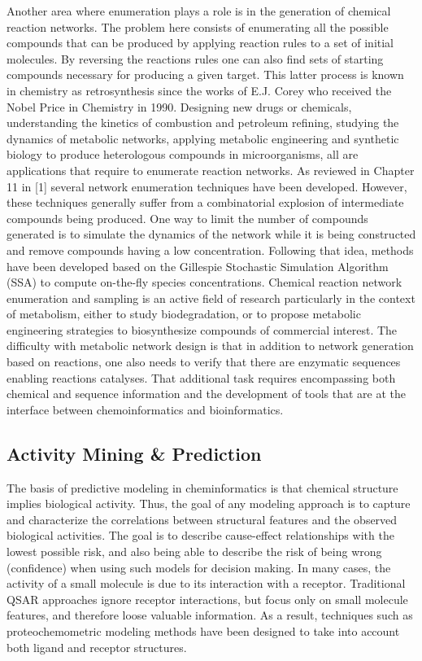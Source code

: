 \documentclass{sig-alternate}
\begin{document}
Another area where enumeration plays a role is in the generation of chemical
reaction networks. The problem here consists of enumerating all the possible
compounds that can be produced by applying reaction rules to a set of initial
molecules. By reversing the reactions rules one can also find sets of starting
compounds necessary for producing a given target. This latter process is known
in chemistry as retrosynthesis since the works of E.J. Corey who received the
Nobel Price in Chemistry in 1990. Designing new drugs or chemicals,
understanding the kinetics of combustion and petroleum refining, studying the
dynamics of metabolic networks, applying metabolic engineering and synthetic
biology to produce heterologous compounds in microorganisms, all are
applications that require to enumerate reaction networks. As reviewed in Chapter
11 in [1] several network enumeration techniques have been developed. However,
these techniques generally suffer from a combinatorial explosion of intermediate
compounds being produced. One way to limit the number of compounds generated is
to simulate the dynamics of the network while it is being constructed and remove
compounds having a low concentration. Following that idea, methods have been
developed based on the Gillespie Stochastic Simulation Algorithm (SSA) to
compute on-the-fly species concentrations. Chemical reaction network enumeration
and sampling is an active field of research particularly in the context of
metabolism, either to study biodegradation, or to propose metabolic engineering
strategies to biosynthesize compounds of commercial interest. The difficulty
with metabolic network design is that in addition to network generation based on
reactions, one also needs to verify that there are enzymatic sequences enabling
reactions catalyses. That additional task requires encompassing both chemical
and sequence information and the development of tools that are at the interface
between chemoinformatics and bioinformatics.

\subsection{Activity Mining \& Prediction}
\label{sec:activity-mining-}


The basis of predictive modeling in cheminformatics is that chemical structure
implies biological activity. Thus, the goal of any modeling approach is to
capture and characterize the correlations between structural features and the
observed biological activities. The goal is to describe cause-effect
relationships with the lowest possible risk, and also being able to describe the
risk of being wrong (confidence) when using such models for decision making. In
many cases, the activity of a small molecule is due to its interaction with a
receptor. Traditional QSAR approaches ignore receptor interactions, but focus
only on small molecule features, and therefore loose valuable information. As a
result, techniques such as proteochemometric modeling methods have been designed
to take into account both ligand and receptor structures.
\end{document}
